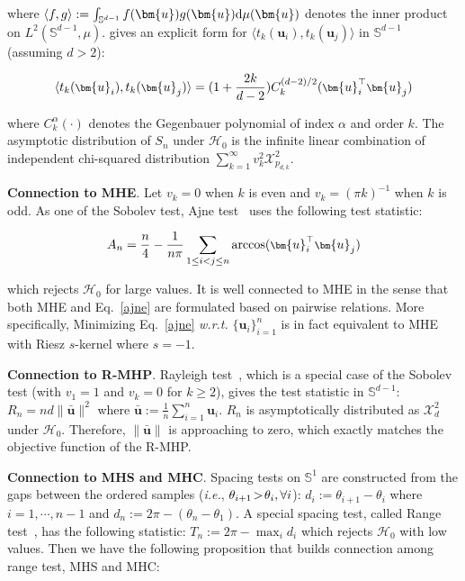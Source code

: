 where $\langle f,g \rangle:=\int_{\mathbb{S}^{d-1}}f(\bm{u})g(\bm{u})\textnormal{d}\mu(\bm{u})$ denotes the inner product on $L^2(\mathbb{S}^{d-1},\mu)$. \cite{prentice1978invariant} gives an explicit form for $\langle t_k(\bm{u}_i),t_k(\bm{u}_j)\rangle$ in $\mathbb{S}^{d-1}$ (assuming $d>2$):

\begin{equation}
\footnotesize
\langle t_k(\bm{u}_i),t_k(\bm{u}_j)\rangle=(1+\frac{2k}{d-2})C_k^{(d-2)/2}(\bm{u}_i^\top\bm{u}_j)
\end{equation}

where $C_k^\alpha(\cdot)$ denotes the Gegenbauer polynomial of index $\alpha$ and order $k$. The  asymptotic distribution of $S_n$ under $\mathcal{H}_0$ is the infinite linear combination of independent chi-squared distribution $\sum_{k=1}^\infty v_k^2\mathcal{X}_{p_{d,k}}^2$. 

\textbf{Connection to MHE}. Let $v_k=0$ when $k$ is even and $v_k=(\pi k)^{-1}$ when $k$ is odd. As one of the Sobolev test, Ajne test~\cite{prentice1978invariant,ajne1968simple} uses the following test statistic:

\begin{equation}\label{ajne}
\footnotesize
    A_n=\frac{n}{4}-\frac{1}{n\pi}\sum_{1\leq i <j\leq n}\arccos(\bm{u}_i^\top\bm{u}_j)
\end{equation}

which rejects $\mathcal{H}_0$ for large values. It is well connected to MHE in the sense that both MHE and Eq.~\eqref{ajne} are formulated based on pairwise relations. More specifically, Minimizing Eq.~\eqref{ajne} \emph{w.r.t.} $\{\bm{u}_i\}_{i=1}^n$ is in fact equivalent to MHE with Riesz $s$-kernel where $s=-1$.
\par

\textbf{Connection to R-MHP}. Rayleigh test~\cite{rayleigh1919xxxi}, which is a special case of the Sobolev test (with $v_1=1$ and $v_k=0$ for $k\geq2$), gives the test statistic in $\mathbb{S}^{d-1}$: $R_n=nd\|\bar{\bm{u}}\|^2$ where $\bar{\bm{u}}:=\frac{1}{n}\sum_{i=1}^n\bm{u}_i$. $R_n$ is asymptotically distributed as $\mathcal{X}_d^2$ under $\mathcal{H}_0$. Therefore, $\|\bar{\bm{u}}\|$ is approaching to zero, which exactly matches the objective function of the R-MHP.
\par

\textbf{Connection to MHS and MHC}. Spacing tests on $\mathbb{S}^1$ are constructed from the gaps between the ordered samples (\emph{i.e.}, $\thickmuskip=2mu \medmuskip=2mu \theta_{i+1}>\theta_{i},\forall i$): $d_i:=\theta_{i+1}-\theta_{i}$ where $i=1,\cdots,n-1$ and $d_n:=2\pi-(\theta_n-\theta_{1})$. A special spacing test, called Range test~\cite{rao1969some}, has the following statistic: $T_n:=2\pi-\max_{i} d_i$ which rejects $\mathcal{H}_0$ with low values. Then we have the following proposition that builds connection among range test, MHS and MHC:


